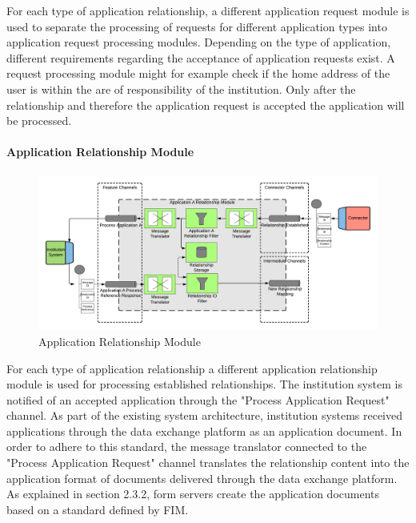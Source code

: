 For each type of application relationship, a different application request module is used to separate the processing of requests for different application types into application request processing modules. Depending on the type of application, different requirements regarding the acceptance of application requests exist. A request processing module might for example check if the home address of the user is within the are of responsibility of the institution. Only after the relationship and therefore the application request is accepted the application will be processed.

\paragraph{Application Relationship Module}

\begin{figure}[H]
    \centering
    \includegraphics[scale=0.6]{Diagrams/Integration Architecture 2/Technological Integration/6. Application Relationship Module.pdf}
    \caption{Application Relationship Module}
    \label{integration2:application_relationship_module}
\end{figure}

For each type of application relationship a different application relationship module is used for processing established relationships. The institution system is notified of an accepted application through the "Process Application Request" channel. As part of the existing system architecture, institution systems received applications through the data exchange platform as an application document. In order to adhere to this standard, the message translator connected to the "Process Application Request" channel translates the relationship content into the application format of documents delivered through the data exchange platform. As explained in section 2.3.2, form servers create the application documents based on a standard defined by FIM.

